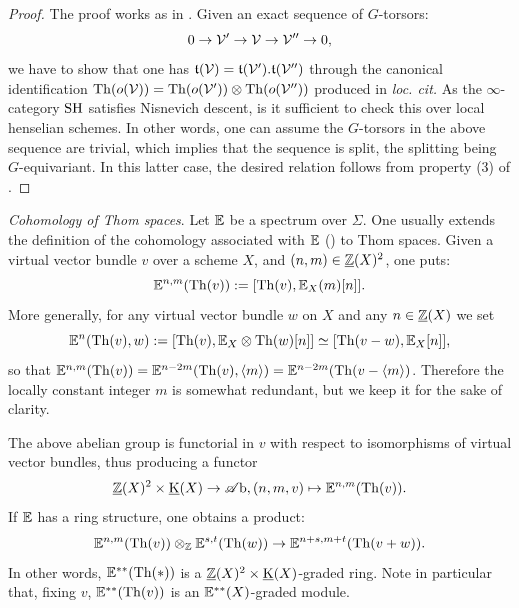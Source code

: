\begin{proof}
The proof works as in \cite[proof of 4.1.1]{Riou}. Given an exact sequence of $G$-torsors:
$$
0 \rightarrow \mathcal V' \rightarrow \mathcal V \rightarrow \mathcal V'' \rightarrow 0,
$$
we have to show that one has $\mathfrak{t}(\mathcal V)=\mathfrak{t}(\mathcal V').\mathfrak{t}(\mathcal V'')$ through
the canonical identification $\operatorname{Th}(o(\mathcal V))=\operatorname{Th}(o(\mathcal V')) \otimes \operatorname{Th}(o(\mathcal V''))$ produced in \emph{loc. cit.}
As the $\infty$-category $\operatorname{SH}$ satisfies Nisnevich descent, is it sufficient to check
this over local henselian schemes. In other words, one can assume the $G$-torsors
in the above sequence are trivial, which implies that the sequence is split,
the splitting being $G$-equivariant.
In this latter case, the desired relation follows from property (3) of .
\end{proof}




\begin{num}\textit{Cohomology of Thom spaces}.
Let $\mathbb E$ be a spectrum over $\Sigma$.
One usually extends the definition of the cohomology associated with $\mathbb E$ 
() to Thom spaces. Given a virtual vector bundle $v$ over a scheme $X$,
and $(n,m) \in \operatorname{\underline {\mathbb{Z}}}(X)^2$, one puts:
$$
\mathbb E^{n,m}(\operatorname{Th}(v)):=[\operatorname{Th}(v),\mathbb E_X(m)[n]].
$$
More generally, for any virtual vector bundle $w$ on $X$ and any $n\in\operatorname{\underline {\mathbb{Z}}}(X)$ we set
\[
\mathbb E^n(\operatorname{Th}(v),w):=[\operatorname{Th}(v),\mathbb E_X\otimes\operatorname{Th}(w)[n]]\simeq [\operatorname{Th}(v-w),\mathbb E_X[n]],
\]
so that $\mathbb E^{n,m}(\operatorname{Th}(v))=\mathbb E^{n-2m}(\operatorname{Th}(v),\langle m\rangle)=\mathbb E^{n-2m}(\operatorname{Th}(v-\langle m\rangle)$. Therefore the locally constant integer $m$ is somewhat redundant, but we keep it for the sake of clarity.

The above abelian group is functorial in $v$ with respect to isomorphisms of virtual vector bundles,
thus producing a functor
$$
\operatorname{\underline {\mathbb{Z}}}(X)^2 \times \operatorname{\underline K}(X) \rightarrow \operatorname{\mathscr Ab}, (n,m,v) \mapsto \mathbb E^{n,m}(\operatorname{Th}(v)).
$$
If $\mathbb E$ has a ring structure, one obtains a product:
$$
\mathbb E^{n,m}(\operatorname{Th}(v)) \otimes_{\mathbb{Z}} \mathbb E^{s,t}(\operatorname{Th}(w)) \rightarrow \mathbb E^{n+s,m+t}(\operatorname{Th}(v+w)).
$$
In other words, $\mathbb E^{**}(\operatorname{Th}(*))$ is a $\operatorname{\underline {\mathbb{Z}}}(X)^2 \times \operatorname{\underline K}(X)$-graded ring.
Note in particular that, fixing $v$, $\mathbb E^{**}(\operatorname{Th}(v))$ is an $\mathbb E^{**}(X)$-graded module.
\end{num}

